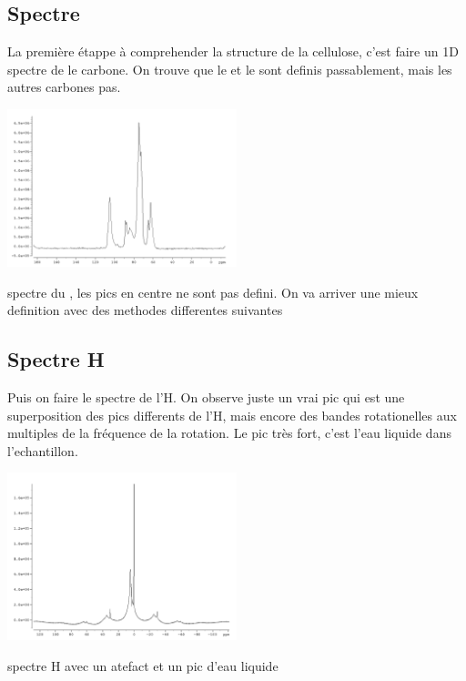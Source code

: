 \documentclass[a4paper,12pt]{scrartcl}
\begin{document}
  \subsection{Spectre }
La première étappe à comprehender la structure de la cellulose, c'est faire un 1D spectre de le carbone. On trouve que le  et le   sont definis passablement, mais les autres carbones pas.
 \begin{figurehere}
    \center
    \includegraphics[width=0.5\textwidth]{bilder/c13_spektum.png}
    \caption{spectre du , les pics en centre ne sont pas defini. On va arriver une mieux definition avec des methodes differentes suivantes}
   \end{figurehere}

  \subsection{Spectre H}
Puis on faire le spectre de l'H. On observe juste un vrai pic qui est une superposition des pics differents de l'H, mais encore des bandes rotationelles aux multiples de la fréquence de la rotation. Le pic très fort, c'est l'eau liquide dans l'echantillon.

\begin{figurehere}
    \center
    \includegraphics[width=0.5\textwidth]{bilder/proton_spektrum.png}
    \caption{spectre H avec un atefact et un pic d'eau liquide}
   \end{figurehere}
\end{document}
